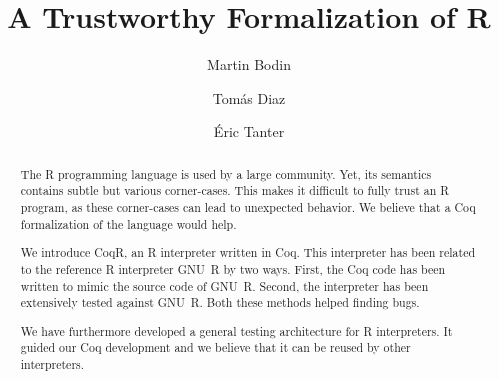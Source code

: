 \documentclass[
    sigplan,
    10pt,
    review, %
    natbib=false %
 ]{acmart}
\newcommand\eti[1]{\todo[color=blue!20,inline]{#1}}
\newcommand\CoqR{CoqR}
\begin{document}
\title{A Trustworthy Formalization of R} %

\author{Martin Bodin}

\author{Tom{\'a}s Diaz}

\author{{\'E}ric Tanter}

\begin{abstract}
\eti{update when paper is stable:}

    The R programming language is used by a large community.
    Yet, its semantics contains subtle but various corner-cases.
    This makes it difficult to fully trust an R program,
    as these corner-cases can lead to unexpected behavior.
    We believe that a Coq formalization of the language would help.

    We introduce \CoqR{}, an R interpreter written in Coq.
    This interpreter has been related to the reference R interpreter
    GNU~R by two ways.
    First, the Coq code has been written to mimic the source code of GNU~R.
    Second, the interpreter has been extensively tested against GNU~R.
    Both these methods helped finding bugs.

    We have furthermore developed a general testing architecture
    for R interpreters.
    It guided our Coq development
    and we believe that it can be reused by other interpreters.
\end{abstract}
\end{document}
